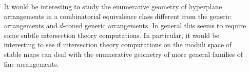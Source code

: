 \documentclass[12pt]{article}
\theoremstyle{plain}
\newtheorem{lemma}[theorem]{Lemma}
\theoremstyle{definition}
\newtheorem{example}[theorem]{Example}
\newcommand{\A}{\mathcal{A}}
\newcommand{\M}{\mathcal{M}}
\renewcommand{\L}{\mathcal{L}}
\newcommand{\MLA}{\M_{\A}}
\newcommand{\C}{\mathbb{C}}
\newcommand{\G}{\mathbb{G}}
\renewcommand{\P}{\ensuremath \mathbb{P}}
\begin{document}



It would be interesting to study the enumerative geometry of
hyperplane arrangements in a combinatorial equivalence class different
from the generic arrangements and $d$-coned generic arrangements. In general this seems
to require some subtle intersection theory computations. In
particular, it would be interesting to see if intersection theory
computations on the moduli space of stable maps can deal with the
enumerative geometry of more general families of line arrangements.






\end{document}
